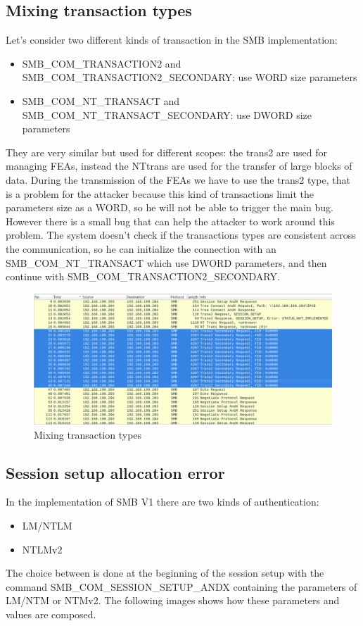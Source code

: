 \clearpage

\subsection{Mixing transaction types}
Let's consider two different kinds of transaction in the SMB implementation:
\begin{itemize}
  \item SMB\_COM\_TRANSACTION2 and SMB\_COM\_TRANSACTION2\_SECONDARY: use WORD size parameters
  \item SMB\_COM\_NT\_TRANSACT and SMB\_COM\_NT\_TRANSACT\_SECONDARY: use DWORD size parameters
\end{itemize}
They are very similar but used for different scopes: the trans2 are used for managing FEAs, instead the NTtrans are used for the 
transfer of large blocks of data.
During the transmission of the FEAs we have to use the trans2 type, that is a problem for the attacker because this kind of transactions limit
the parameters size as a WORD, so he will not be able to trigger the main bug.
However there is a small bug that can help the attacker to work around this problem. The system doesn't check if the transactions types are 
consistent across the communication, so he can initialize the connection with an SMB\_COM\_NT\_TRANSACT which use DWORD parameters, and then continue with SMB\_COM\_TRANSACTION2\_SECONDARY.

\begin{figure}[ht!]
  \centering
    \includegraphics[scale=0.35]{images/ws_trans2_requests.png}
    \caption{Mixing transaction types}
\end{figure}

\clearpage

\subsection{Session setup allocation error}
In the implementation of SMB V1 there are two kinds of authentication:
\begin{itemize}
  \item LM/NTLM
  \item NTLMv2
\end{itemize}
The choice between is done at the beginning of the session setup with the command
SMB\_COM\_SESSION\_SETUP\_ANDX containing the parameters of LM/NTM or NTMv2.
The following images shows how these parameters and values are composed.


